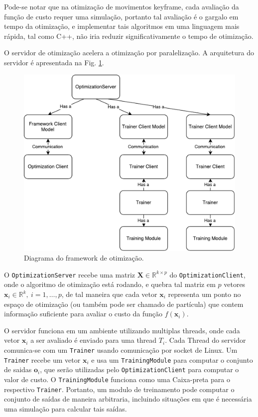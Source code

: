\documentclass[
10pt, %
a4paper, %
oneside, %
headinclude,footinclude, %
BCOR5mm, %
]{scrartcl}
\newcommand*{\inlinecode}{\texttt}%
\begin{document}
Pode-se notar que na otimização de movimentos keyframe, cada avaliação da função de custo requer uma simulação, portanto tal avaliação é o gargalo em tempo da otimização, e implementar tais algoritmos em uma linguagem mais rápida, tal como C++, não iria reduzir significativamente o tempo de otimização. 

O servidor de otimização acelera a otimização por paralelização. A arquitetura do servidor é apresentada na Fig. \ref{fig:serverDiagram}.

\begin{figure}[htb]
\begin{center}
\includegraphics[scale=0.6]{diagramaServidorOtimizacao.pdf}
\end{center}
\caption{\label{fig:serverDiagram}Diagrama do framework de otimização.}
\end{figure}

O \inlinecode{OptimizationServer} recebe uma matriz  $\mathrm{\mathbf{X}} \in \mathbb{R}^{k\times p} $
do \inlinecode{OptimizationClient}, onde o algoritmo de otimização está rodando, e quebra tal matriz em \( p \) vetores $\mathrm{\mathbf{x}}_i \in \mathbb{R}^k, \ i = 1,\dots, p$, de tal maneira que cada vetor \( \mathrm{\mathbf{x}}_i \) representa um ponto no espaço de otimização (ou também pode ser chamado de partícula) que contem informação suficiente para avaliar o custo da função \( f \left( \mathrm{\mathbf{x}}_i \right) \).

O servidor funciona em um ambiente utilizando multiplas threads, onde cada vetor \( \mathrm{\mathbf{x}}_i \) a ser avaliado é enviado para uma thread \( T_i \).
Cada Thread do servidor comunica-se com um \inlinecode{Trainer} usando comunicação por socket de Linux. Um \inlinecode{Trainer} recebe um vetor \( \mathrm{\mathbf{x}}_i \) e usa um \inlinecode{TrainingModule} para computar o conjunto de saidas \( \mathrm{\mathbf{o}}_i \), que serão utilizadas pelo \inlinecode{OptimizationClient} para computar o valor de custo. O \inlinecode{TrainingModule} funciona como uma Caixa-preta para o respectivo \inlinecode{Trainer}. Portanto, um modulo de treinamento pode computar o conjunto de saídas de maneira arbitraria, incluindo situações em que é necessária uma simulação para calcular tais saídas.
\end{document}
